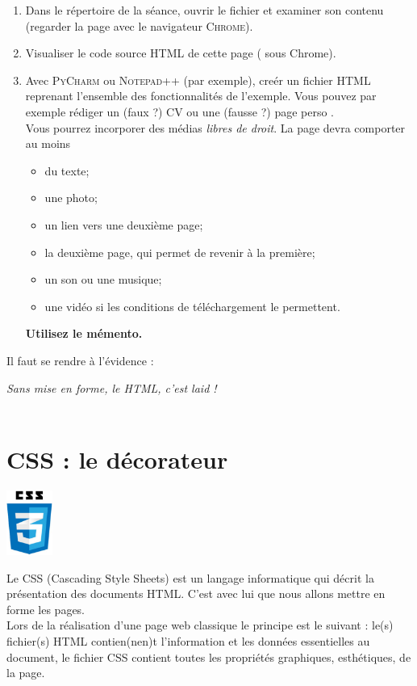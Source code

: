 \documentclass[a4paper,12pt,french]{book}
\begin{document}
\begin{exercice}
	\begin{enumerate}[--]
		\item 	Dans le répertoire  de la séance, ouvrir le fichier  et examiner son contenu (regarder la page 
		avec le 
		navigateur \textsc{Chrome}).
		\item 	Visualiser le code source \textsc{HTML} de cette page ( sous Chrome).
		\item 	Avec \textsc{PyCharm} ou \textsc{Notepad++} (par exemple), creér un fichier \textsc{HTML} reprenant l'ensemble des fonctionnalités de l'exemple. 
				Vous pouvez par exemple rédiger un (faux ?) CV ou une (fausse ?) \og page perso \fg.\\
				Vous pourrez incorporer des médias \textit{libres de droit}. La page devra comporter au moins 
				\begin{itemize}
				\item 	du texte;
				\item 	une photo;
				\item 	un lien vers une deuxième page;
				\item	la deuxième page, qui permet de revenir à la première;
				\item 	un son ou une musique;
				\item 	une vidéo si les conditions de téléchargement le permettent.
				\end{itemize}
		\textbf{Utilisez le mémento.}
	\end{enumerate}
	Il faut se rendre à l'évidence :
	\begin{center}
	\textit{Sans mise en forme, le \textsc{HTML}, c'est laid !\\ \ }\\
	\end{center}
\end{exercice}
	
\section{CSS : le décorateur}
	\begin{center}
		\includegraphics[width=1.5cm]{img/css}
	\end{center}
	Le CSS (Cascading Style Sheets) est un langage informatique qui décrit la présentation des documents \textsc{HTML}. C'est avec lui que nous 
	allons mettre 
	en forme les pages.\\
	Lors de la réalisation d'une page web \og classique \fg{} le principe est le suivant : le(s) fichier(s) \textsc{HTML} contien(nen)t l'information 
	et les 
	données essentielles au document,  le fichier CSS contient toutes les propriétés graphiques, esthétiques, de la page.
	
\end{document}
